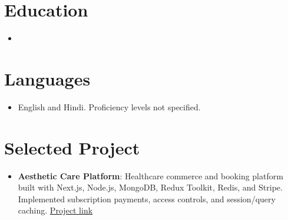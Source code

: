 \documentclass[11pt,a4paper,sans]{moderncv}
\begin{document}

\newpage
\section{Education}
\vspace{1pt}
\begin{itemize}

\item{}

\vspace{3pt}


\end{itemize}


\section{Languages}
\vspace{1pt}
\begin{itemize}
\item {English and Hindi. Proficiency levels not specified.}
\end{itemize}


\section{Selected Project}
\vspace{1pt}
\begin{itemize}
\item {\textbf{Aesthetic Care Platform}: Healthcare commerce and booking platform built with Next.js, Node.js, MongoDB, Redux Toolkit, Redis, and Stripe. Implemented subscription payments, access controls, and session/query caching. \href{https://shahinahoja.com/}{Project link}}
\end{itemize}
\end{document}
